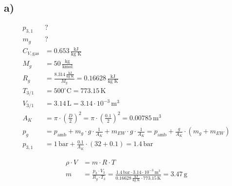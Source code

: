 

\subsection*{a)}

\begin{align*}
    p_{3,1} & ? \\
    m_{g} & ? \\
    C_{V,\text{gas}} & = 0.653 \, \frac{\text{kJ}}{\text{kg K}} \\
    M_{g} & = 50 \, \frac{\text{kg}}{\text{kmol}} \\
    R_{g} & = \frac{8.314 \, \frac{\text{kJ}}{\text{kg K}}}{M_{g}} = 0.16628 \, \frac{\text{kJ}}{\text{kg K}} \\
    T_{3/1} & = 500^\circ \text{C} = 773.15 \, \text{K} \\
    V_{3/1} & = 3.14 \, \text{L} = 3.14 \cdot 10^{-3} \, \text{m}^3 \\
    A_{K} & = \pi \cdot \left( \frac{D}{2} \right)^2 = \pi \cdot \left( \frac{0.1}{2} \right)^2 = 0.00785 \, \text{m}^3 \\
    p_{g} & = p_{\text{amb}} + m_{g} \cdot g \cdot \frac{1}{A_{K}} + m_{EW} \cdot g \cdot \frac{1}{A_{K}} = p_{\text{amb}} + \frac{g}{A_{K}} \cdot (m_{g} + m_{EW}) \\
    p_{3,1} & = 1 \, \text{bar} + \frac{0.1}{A_{K}} \cdot (32 + 0.1) = 1.4 \, \text{bar}
\end{align*}

\begin{align*}
    \rho \cdot V & = m \cdot R \cdot T \\
    m & = \frac{p_{3} \cdot V_{3}}{R_{g} \cdot T_{3}} = \frac{1.4 \, \text{bar} \cdot 3.14 \cdot 10^{-3} \, \text{m}^3}{0.16628 \, \frac{\text{kJ}}{\text{kg K}} \cdot 773.15 \, \text{K}} = 3.47 \, \text{g}
\end{align*}